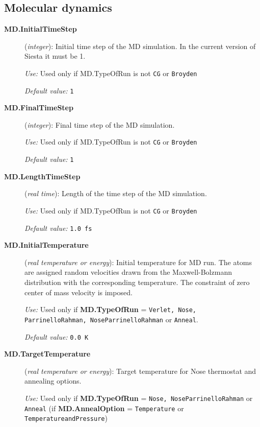\documentclass[11pt]{article}
\begin{document}
\subsection{Molecular dynamics}
\begin{description}

\item[{\bf MD.InitialTimeStep}] ({\it integer}): 
Initial time step of the MD simulation.
In the current version of {\sc Siesta} it must be 1.

{\it Use:} Used only if MD.TypeOfRun is not {\tt CG} or {\tt Broyden}
    
{\it Default value:} {\tt 1}

\item[{\bf MD.FinalTimeStep}] ({\it integer}): 
Final time step of the MD simulation.

{\it Use:} Used only if MD.TypeOfRun is not {\tt CG} or {\tt Broyden}
    
{\it Default value:} {\tt 1}

\item[{\bf MD.LengthTimeStep}] ({\it real time}): 
Length of the time step of the MD simulation.

{\it Use:} Used only if MD.TypeOfRun is not {\tt CG} or {\tt Broyden}
    
{\it Default value:} {\tt 1.0 fs}

\item[{\bf MD.InitialTemperature}] ({\it real temperature or energy}): 
Initial temperature for MD run. The atoms are assigned random 
velocities drawn from the Maxwell-Bolzmann distribution with the
corresponding temperature. The constraint of zero center of
mass velocity is imposed.

{\it Use:} Used only if {\bf MD.TypeOfRun} = {\tt Verlet, Nose, 
ParrinelloRahman, NoseParrinelloRahman}
or {\tt Anneal}.

{\it Default value:} {\tt 0.0 K}


\item[{\bf MD.TargetTemperature}] ({\it real temperature or energy}): 
Target temperature for Nose thermostat and annealing options.

{\it Use:} Used only if {\bf MD.TypeOfRun} = {\tt Nose, NoseParrinelloRahman}
or {\tt Anneal} (if {\bf MD.AnnealOption} = {\tt Temperature} or 
{\tt TemperatureandPressure})


\end{description}
\end{document}
